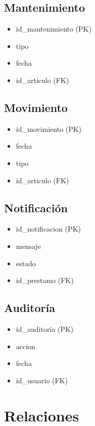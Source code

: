 \documentclass{article}
\begin{document}
\subsection{Mantenimiento}
\begin{itemize}
    \item id\_mantenimiento (PK)
    \item tipo
    \item fecha
    \item id\_articulo (FK)
\end{itemize}

\subsection{Movimiento}
\begin{itemize}
    \item id\_movimiento (PK)
    \item fecha
    \item tipo
    \item id\_articulo (FK)
\end{itemize}

\subsection{Notificación}
\begin{itemize}
    \item id\_notificacion (PK)
    \item mensaje
    \item estado
    \item id\_prestamo (FK)
\end{itemize}

\subsection{Auditoría}
\begin{itemize}
    \item id\_auditoria (PK)
    \item accion
    \item fecha
    \item id\_usuario (FK)
\end{itemize}

\section{Relaciones}
\end{document}
